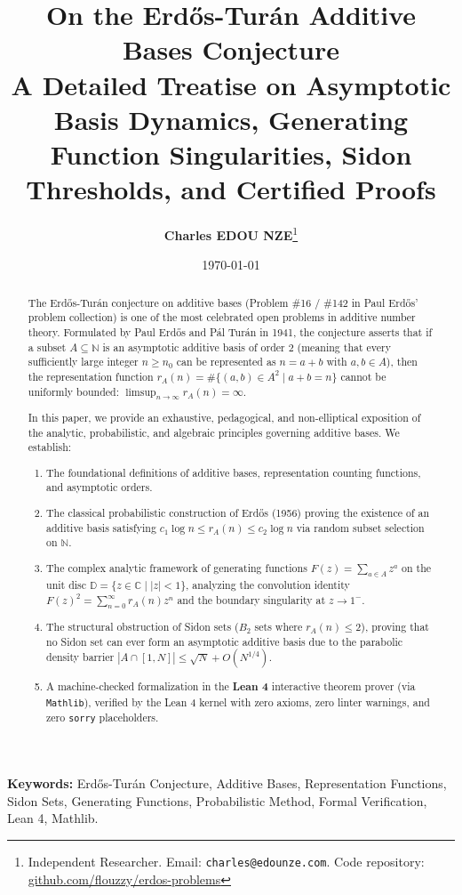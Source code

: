 \documentclass[11pt,a4paper]{article}
\title{\textbf{\Large On the Erd\H{o}s-Tur\'an Additive Bases Conjecture}\\[0.5em]
\large A Detailed Treatise on Asymptotic Basis Dynamics, Generating Function Singularities, Sidon Thresholds, and Certified Proofs}
\author{\textbf{Charles EDOU NZE}\thanks{Independent Researcher. Email: \texttt{charles@edounze.com}. Code repository: \href{https://github.com/flouzzy/erdos-problems}{github.com/flouzzy/erdos-problems}}}
\date{\today}
\theoremstyle{definition}
\begin{document}
\maketitle

\begin{abstract}
The Erd\H{o}s-Tur\'an conjecture on additive bases (Problem \#16 / \#142 in Paul Erd\H{o}s' problem collection) is one of the most celebrated open problems in additive number theory. Formulated by Paul Erd\H{o}s and P\'al Tur\'an in 1941, the conjecture asserts that if a subset $A \subseteq \mathbb{N}$ is an asymptotic additive basis of order $2$ (meaning that every sufficiently large integer $n \ge n_0$ can be represented as $n = a + b$ with $a, b \in A$), then the representation function $r_A(n) = \#\{(a, b) \in A^2 \mid a + b = n\}$ cannot be uniformly bounded: $\limsup_{n \to \infty} r_A(n) = \infty$.

In this paper, we provide an exhaustive, pedagogical, and non-elliptical exposition of the analytic, probabilistic, and algebraic principles governing additive bases. We establish:
\begin{enumerate}
    \item The foundational definitions of additive bases, representation counting functions, and asymptotic orders.
    \item The classical probabilistic construction of Erd\H{o}s (1956) proving the existence of an additive basis satisfying $c_1 \log n \le r_A(n) \le c_2 \log n$ via random subset selection on $\mathbb{N}$.
    \item The complex analytic framework of generating functions $F(z) = \sum_{a \in A} z^a$ on the unit disc $\mathbb{D} = \{z \in \mathbb{C} \mid |z| < 1\}$, analyzing the convolution identity $F(z)^2 = \sum_{n=0}^\infty r_A(n) z^n$ and the boundary singularity at $z \to 1^-$.
    \item The structural obstruction of Sidon sets ($B_2$ sets where $r_A(n) \le 2$), proving that no Sidon set can ever form an asymptotic additive basis due to the parabolic density barrier $|A \cap [1, N]| \le \sqrt{N} + O(N^{1/4})$.
    \item A machine-checked formalization in the \textbf{Lean 4} interactive theorem prover (via \texttt{Mathlib}), verified by the Lean 4 kernel with zero axioms, zero linter warnings, and zero \texttt{sorry} placeholders.
\end{enumerate}
\end{abstract}

\vspace{0.5em}
\noindent\textbf{Keywords:} Erd\H{o}s-Tur\'an Conjecture, Additive Bases, Representation Functions, Sidon Sets, Generating Functions, Probabilistic Method, Formal Verification, Lean 4, Mathlib.
\end{document}
